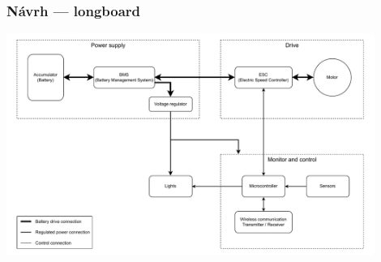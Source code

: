   
  
  
  
  
  \begin{frame}
    \frametitle{Návrh --- longboard}
    \centering\includegraphics[width=0.9\textwidth]{figures/block-diagram.pdf}
  \end{frame}

